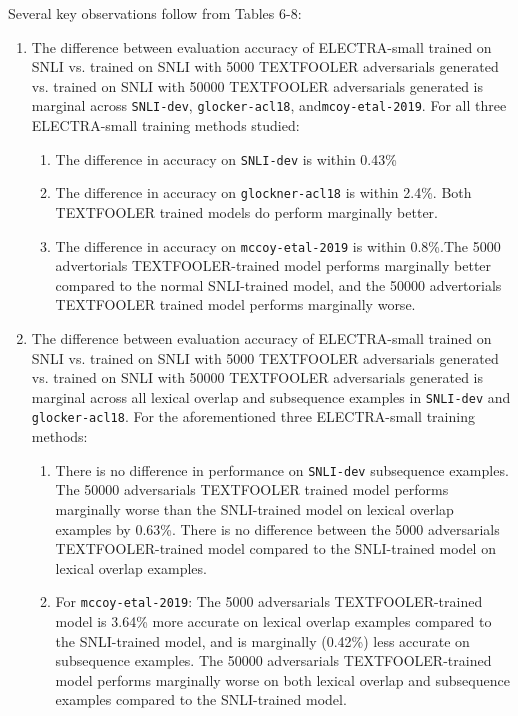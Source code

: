 \documentclass[11pt,a4paper]{article}
\begin{document}
Several key observations follow from Tables 6-8:
\begin{enumerate}
  \item The difference between evaluation accuracy of ELECTRA-small trained on SNLI vs. trained on SNLI with 5000 TEXTFOOLER adversarials generated vs. trained on SNLI with 50000 TEXTFOOLER adversarials generated is marginal across \texttt{SNLI-dev}, \texttt{glocker-acl18}, and\texttt{mcoy-etal-2019}. For all three ELECTRA-small training methods studied:
  \begin{enumerate}
      \item The difference in accuracy on \texttt{SNLI-dev} is within 0.43\%
      \item The difference in accuracy on \texttt{glockner-acl18} is within 2.4\%. Both TEXTFOOLER trained models do perform marginally better.
      \item The difference in accuracy on \texttt{mccoy-etal-2019} is within 0.8\%.The 5000 advertorials TEXTFOOLER-trained model performs marginally better compared to the normal SNLI-trained model, and the 50000 advertorials TEXTFOOLER trained model performs marginally worse.
  \end{enumerate}
  \item The difference between evaluation accuracy of ELECTRA-small trained on SNLI vs. trained on SNLI with 5000 TEXTFOOLER adversarials generated vs. trained on SNLI with 50000 TEXTFOOLER adversarials generated is marginal across all lexical overlap and subsequence examples in \texttt{SNLI-dev} and \texttt{glocker-acl18}. For the aforementioned three ELECTRA-small training methods:
  \begin{enumerate}
      \item There is no difference in performance on \texttt{SNLI-dev} subsequence examples. The 50000 adversarials TEXTFOOLER trained model performs marginally worse than the SNLI-trained model on lexical overlap examples by 0.63\%. There is no difference between the 5000 adversarials TEXTFOOLER-trained model compared to the SNLI-trained model on lexical overlap examples.
      \item For \texttt{mccoy-etal-2019}: The 5000 adversarials TEXTFOOLER-trained model is 3.64\% more accurate on lexical overlap examples compared to the SNLI-trained model, and is marginally (0.42\%) less accurate on subsequence examples. The 50000 adversarials TEXTFOOLER-trained model performs marginally worse on both lexical overlap and subsequence examples compared to the SNLI-trained model.
  \end{enumerate}
\end{enumerate}
\end{document}
